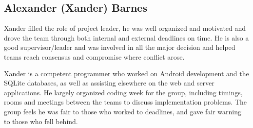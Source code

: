 \subsection{Alexander (Xander) Barnes}
	Xander filled the role of project leader, he was well organized and motivated and drove the team through both internal and external deadlines on time. He is also a good supervisor/leader and was involved in all the major decision and helped teams reach consensus and compromise where conflict arose.

	Xander is a competent programmer who worked on Android development and the SQLite databases, as well as assisting elsewhere on the web and server applications. He largely organized coding week for the group, including timings, rooms and meetings between the teams to discuss implementation problems. The group feels he was fair to those who worked to deadlines, and gave fair warning to those who fell behind. 